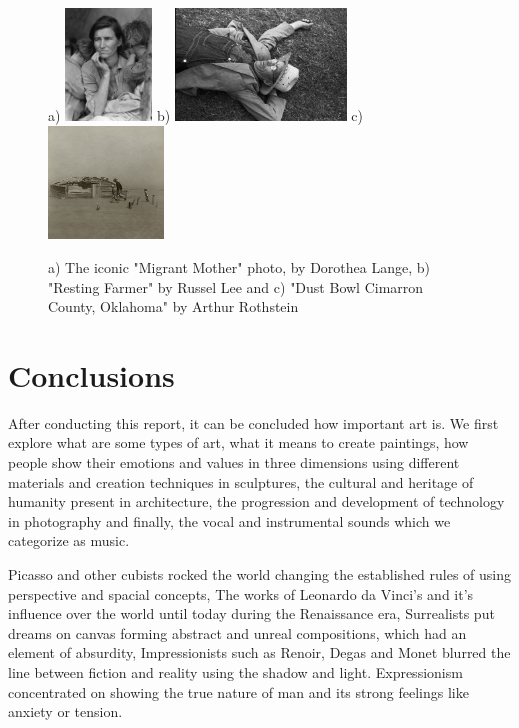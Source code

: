 \documentclass{report}
\begin{document}
\begin{itemize}
\begin{figure}[h]
\center
a) \includegraphics[height=3cm]{img/migrantmother}
b) \includegraphics[height=3cm]{img/restingfarmer}
c) \includegraphics[height=3cm]{img/dust}
\caption{a) The iconic "Migrant Mother" photo, by Dorothea Lange, b) "Resting Farmer" by Russel Lee and c) "Dust Bowl Cimarron County, Oklahoma" by Arthur Rothstein}
\label{fig:fsaproject}
\end{figure}

\end{itemize}

\chapter{Conclusions}
\label{chap.conclusions}

After conducting this report, it can be concluded how important art is. We first explore what are some types of art, what it means to create paintings, how people show their emotions and values in three dimensions using different materials and creation techniques in sculptures, the cultural and heritage of humanity present in architecture, the progression and development of technology in photography and finally, the vocal and instrumental sounds which we categorize as music.

Picasso and other cubists rocked the world changing the established rules of using perspective and spacial concepts, The works of Leonardo da Vinci's and it's influence over the world until today during the Renaissance era, Surrealists put dreams on canvas forming abstract and unreal compositions, which had an element of absurdity, Impressionists such as Renoir, Degas and Monet blurred the line between fiction and reality using the shadow and light. Expressionism concentrated on showing the true nature of man and its strong feelings like anxiety or tension. 
\end{document}
